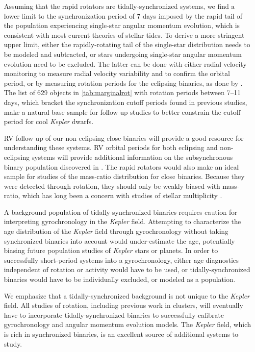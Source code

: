 \documentclass[twocolumn]{aastex6}
\newcommand{\Kepler}{\mbox{\textit{Kepler}}}
\begin{document}
Assuming that the rapid rotators are tidally-synchronized systems, we find a
lower limit to the synchronization period of 7 days imposed by the rapid tail
of the population experiencing single-star angular momentum evolution, which is
consistent with most current theories of stellar tides. To derive a more
stringent upper limit, either the rapidly-rotating tail of the single-star
distribution needs to be modeled and subtracted, or stars undergoing 
single-star angular momentum evolution need to be excluded. The latter can be
done with either radial velocity monitoring to measure radial velocity
variability and to confirm the orbital period, or by measuring rotation periods
for the eclipsing binaries, as done by \citet{Lurie17}. The list of 629
objects in \cref{tab:marginalrot} with rotation periods between 7--11 days, 
which bracket the synchronization cutoff periods found in previous studies,
make a natural base sample for follow-up studies to better constrain the 
cutoff period for cool \Kepler{} dwarfs.

RV follow-up of our non-eclipsing close binaries will provide a good resource
for understanding these systems. RV orbital periods for both eclipsing and 
non-eclipsing systems 
will provide additional information on the subsynchronous binary population 
discovered in \citet{Lurie17}. The rapid rotators would also make an ideal 
sample for studies of the mass-ratio distribution for close binaries. Because 
they were detected through rotation, they should only be weakly biased with 
mass-ratio, which has long been a concern with studies of stellar multiplicity
\citep{Halbwachs03}.

A background population of tidally-synchronized binaries requires caution for
interpreting gyrochronology in the \Kepler{} field. Attempting to characterize
the age distribution of the \Kepler{} field through gyrochronology without 
taking synchronized binaries into account would under-estimate the age, 
potentially biasing future population studies of \Kepler{} stars or planets. 
In order to successfully short-period systems into a gyrochronology, either 
age diagnostics independent of rotation or activity would have to be used, or
tidally-synchronized binaries would have to be individually excluded, or
modeled as a population.

We emphasize that a tidally-synchronized background is not unique to the
\Kepler{} field. All studies of rotation, including previous work in clusters,
will eventually have to incorporate tidally-synchronized binaries to
successfully calibrate gyrochronology and angular momentum evolution models.
The \Kepler{} field, which is rich in synchronized binaries, is an excellent 
source of additional systems to study.
\end{document}
